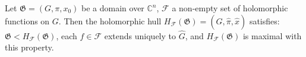 Let $\mathfrak{G} = (G, \pi, x_0)$ be a domain over $\mathbb{C}^n$, $\mathcal{F}$ a non-empty set of holomorphic functions on $G$. Then the holomorphic hull $H_{\mathcal{F}}(\mathfrak{G}) = (\hat{G}, \hat{\pi}, \hat{x})$ satisfies: $\mathfrak{G} < H_{\mathcal{F}}(\mathfrak{G})$, each $f \in \mathcal{F}$ extends uniquely to $\hat{G}$, and $H_{\mathcal{F}}(\mathfrak{G})$ is maximal with this property.
